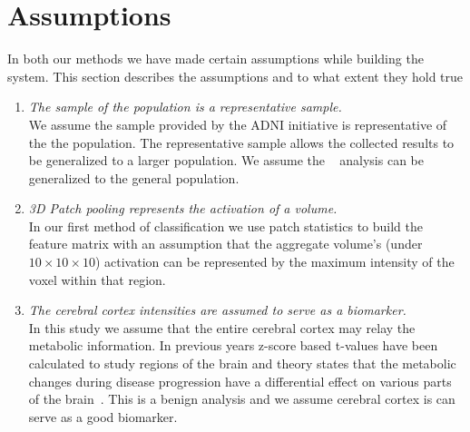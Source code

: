 \section{Assumptions}
In both our methods we have made certain assumptions while building the system. This section describes the assumptions and to what extent they hold true 
\begin{enumerate}
\item \textit{The sample of the population is a representative sample.}\\
We assume the sample provided by the ADNI initiative is representative of the the population. The representative sample allows the collected results to be generalized to a larger population. We assume the \FDGPET~ analysis can be generalized to the general population.
\item \textit{3D Patch pooling represents the activation of a volume.}\\
In our first method of classification we use patch statistics to build the feature matrix with an assumption that the aggregate volume's (under $ 10\times10\times10 $) activation can be represented by the maximum intensity of the voxel within that region.   
\item \textit{The cerebral cortex intensities are assumed to serve as a biomarker.}\\
In this study we assume that the entire cerebral cortex may relay the metabolic information. In previous years z-score based t-values have been calculated to study regions of the brain and theory states that the metabolic changes during disease progression have a differential effect on various parts of the brain~\citep{ishii2014pet}. This is a benign analysis and we assume cerebral cortex is can serve as a good biomarker. 
\end{enumerate}
